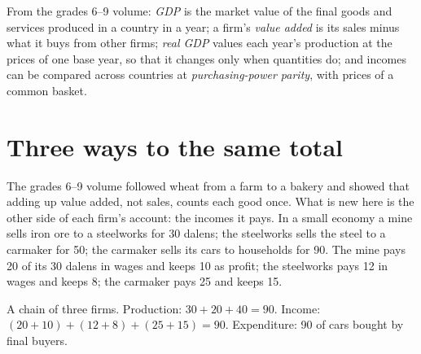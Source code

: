 \begin{recall}
From the grades 6--9 volume: \emph{GDP} is the market value of the final goods and services produced in a country in a year; a firm's \emph{value
added} is its sales minus what it buys from other firms; \emph{real GDP} values each year's production at the prices of one base year, so that it
changes only when quantities do; and incomes can be compared across countries at \emph{purchasing-power parity}, with prices of a common basket.
\end{recall}

\section{Three ways to the same total}\label{sec:g10:national-accounts:three}

The grades 6--9 volume followed wheat from a farm to a bakery and showed that adding up value added, not sales, counts each good once. What
is new here is the other side of each firm's account: the incomes it pays. In a small economy a mine sells iron ore to a steelworks for 30
dalens; the steelworks sells the steel to a carmaker for 50; the carmaker sells its cars to households for 90. The mine pays 20 of its 30 dalens
in wages and keeps 10 as profit; the steelworks pays 12 in wages and keeps 8; the carmaker pays 25 and keeps 15.

\begin{omfigure}

{\small A chain of three firms. Production: $30 + 20 + 40 = 90$. Income: $(20 + 10) + (12 + 8) + (25 + 15) = 90$. Expenditure: 90 of cars bought by final
buyers.}
\end{omfigure}

